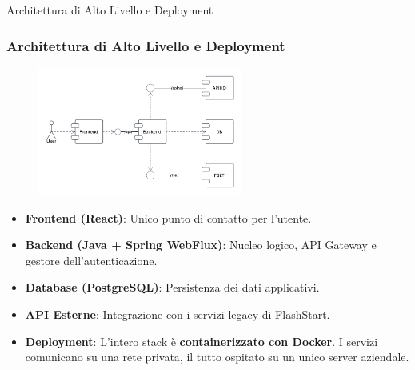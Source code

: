 \documentclass[8pt]{beamer}
\begin{document}
\begin{frame}{Architettura di Alto Livello e Deployment}
  \frametitle{Architettura di Alto Livello e Deployment}

  \begin{figure}
    \centering
    \includegraphics[width=0.6\textwidth]{figures/components.pdf}
  \end{figure}

  \begin{itemize}
    \item \textbf{Frontend (React)}: Unico punto di contatto per l'utente.
    \item \textbf{Backend (Java + Spring WebFlux)}: Nucleo logico, API Gateway e gestore dell'autenticazione.
    \item \textbf{Database (PostgreSQL)}: Persistenza dei dati applicativi.
    \item \textbf{API Esterne}: Integrazione con i servizi legacy di FlashStart.
    \item \alert{\textbf{Deployment}}: L'intero stack è \textbf{containerizzato con Docker}. I servizi comunicano su una rete privata, il tutto ospitato su un unico server aziendale.
  \end{itemize}

\end{frame}
\end{document}
